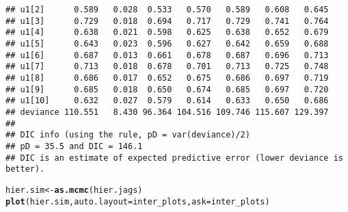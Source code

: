 \documentclass[12pt,letterpaper,oneside]{article}\usepackage{graphicx, color}
\makeatletter
\newcommand{\hlfunctioncall}[1]{\textcolor[rgb]{0.501960784313725,0,0.329411764705882}{\textbf{#1}}}%
\newenvironment{kframe}{%
 \def\at@end@of@kframe{}%
 \ifinner\ifhmode%
  \def\at@end@of@kframe{\end{minipage}}%
  \begin{minipage}{\columnwidth}%
 \fi\fi%
 \def\FrameCommand##1{\hskip\@totalleftmargin \hskip-\fboxsep
 \colorbox{shadecolor}{##1}\hskip-\fboxsep
     \hskip-\linewidth \hskip-\@totalleftmargin \hskip\columnwidth}%
 \MakeFramed {\advance\hsize-\width
   \@totalleftmargin\z@ \linewidth\hsize
   \@setminipage}}%
 {\par\unskip\endMakeFramed%
 \at@end@of@kframe}
\newenvironment{knitrout}{}{} %
\makeatother
\begin{document}
\begin{knitrout}
\begin{kframe}
\begin{verbatim}
## u1[2]      0.589   0.028  0.533   0.570   0.589   0.608   0.645
## u1[3]      0.729   0.018  0.694   0.717   0.729   0.741   0.764
## u1[4]      0.638   0.021  0.598   0.625   0.638   0.652   0.679
## u1[5]      0.643   0.023  0.596   0.627   0.642   0.659   0.688
## u1[6]      0.687   0.013  0.661   0.678   0.687   0.696   0.713
## u1[7]      0.713   0.018  0.678   0.701   0.713   0.725   0.748
## u1[8]      0.686   0.017  0.652   0.675   0.686   0.697   0.719
## u1[9]      0.685   0.018  0.650   0.674   0.685   0.697   0.720
## u1[10]     0.632   0.027  0.579   0.614   0.633   0.650   0.686
## deviance 110.551   8.430 96.364 104.516 109.746 115.607 129.397
## 
## DIC info (using the rule, pD = var(deviance)/2)
## pD = 35.5 and DIC = 146.1
## DIC is an estimate of expected predictive error (lower deviance is better).
\end{verbatim}
\begin{alltt}
hier.sim <- \hlfunctioncall{as.mcmc}(hier.jags)
\hlfunctioncall{plot}(hier.sim, auto.layout = inter_plots, ask = inter_plots)
\end{alltt}
\end{kframe}


\end{knitrout}
\end{document}
